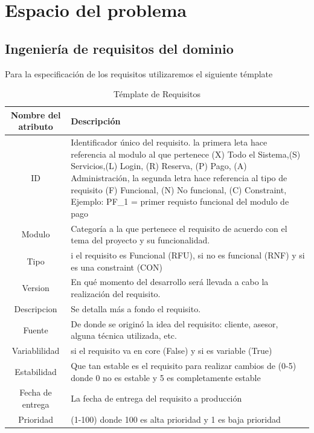 \documentclass[10pt,a4paper,openany]{book}
\begin{document}
\chapter{Espacio del problema}

\section{Ingeniería de requisitos del dominio}
Para la especificación de los requisitos utilizaremos el siguiente témplate

\begin{table}[htbp]
\centering
\begin{tabular}{|c|p{10cm}|} \hline
Nombre del atributo & Descripción \\[0.5ex] \hline
ID & Identificador único del requisito. la primera leta hace referencia al modulo al que pertenece (X) Todo el Sistema,(S) Servicios,(L) Login, (R) Reserva, (P) Pago, (A) Administración, la segunda letra hace referencia al tipo de requisito (F) Funcional, (N) No funcional, (C) Constraint, Ejemplo: PF\_1 = primer requisto funcional del modulo de pago \\[0.5ex] \hline
Modulo & Categoría a la que pertenece el requisito de acuerdo con el tema del proyecto y su funcionalidad.\\[0.5ex] \hline
Tipo & i el requisito es Funcional (RFU), si no es funcional (RNF) y si es una constraint (CON) \\[0.5ex] \hline
Version & En qué momento del desarrollo será llevada a cabo la realización del requisito.\\[0.5ex] \hline
Descripcion & Se detalla más a fondo el requisito.\\[0.5ex] \hline
Fuente & De donde se originó la idea del requisito: cliente, asesor, alguna técnica utilizada, etc.\\[0.5ex] \hline
Variablilidad & si el requisito va en core (False) y si es variable (True) \\[0.5ex] \hline
Estabilidad &  Que tan estable es el requisito para realizar cambios de (0-5) donde 0 no es estable y 5 es completamente estable\\[0.5ex] \hline
Fecha de entrega & La fecha de entrega del requisito a producción\\[0.5ex] \hline
Prioridad & (1-100) donde 100 es alta prioridad y 1 es baja prioridad\\[0.5ex] \hline
\end{tabular}
\caption{Témplate de Requisitos}
\label{table:t6}
\end{table}
\end{document}
